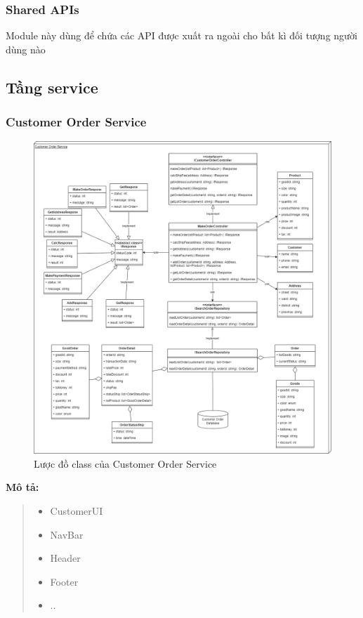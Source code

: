 \subsubsection{Shared APIs}
Module này dùng để chứa các API được xuất ra ngoài cho bất kì đối tượng người dùng nào




\subsection{Tầng service}

\subsubsection{Customer Order Service}
\begin{figure}[!htp]
	\centering
	\includegraphics[width=13cm]{img/Architecture/service/CustomerOrderService.png}
	\newline
	\caption{Lược đồ class của Customer Order Service}
\end{figure}
\textbf{Mô tả:}
\begin{quote}
	\begin{itemize}
		\item CustomerUI
		\item NavBar
		\item Header
		\item Footer
		\item ..
	\end{itemize}
\end{quote}


